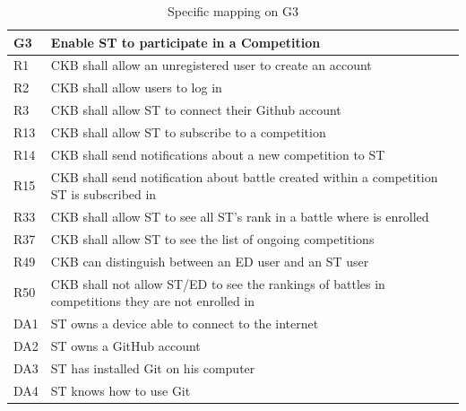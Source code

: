  \begin{table}[H]
    \begin{tabular}{|l|p{12cm}| }
      \hline
      \textbf{G3} & \textbf{Enable ST to participate in a Competition}      \\
      \hline
      R1 & CKB shall allow an unregistered user to create an account \\
      \hline
      R2 & CKB shall allow users to log in \\
      \hline
      R3 & CKB shall allow ST to connect their Github account \\
      \hline
      R13 & CKB shall allow ST to subscribe to a competition \\
      \hline
      R14 & CKB shall send notifications about a new competition to ST \\
      \hline
      R15 & CKB shall send notification about battle created within a competition ST is subscribed in \\
      \hline
      R33 & CKB shall allow ST to see all ST’s rank in a battle where is enrolled \\
      \hline
      R37 & CKB shall allow ST to see the list of ongoing competitions \\
      \hline
      R49 & CKB can distinguish between an ED user and an ST user \\
      \hline
      R50 & CKB shall not allow ST/ED to see the rankings of battles in competitions they are not enrolled in \\
      \hline
      DA1 & ST owns a device able to connect to the internet \\
      \hline
      DA2 & ST owns a GitHub account \\
      \hline
      DA3 & ST has installed Git on his computer \\
      \hline
      DA4 & ST knows how to use Git \\
      \hline

    \end{tabular}
    \caption{Specific mapping on G3}
    \label{tab:mappingG3}
  \end{table}

